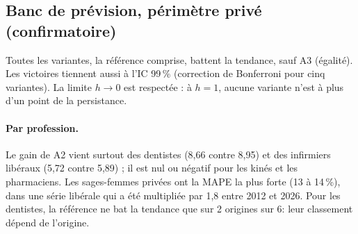 \documentclass[11pt]{article}
\begin{document}
\subsection{Banc de prévision, périmètre privé (confirmatoire)}
\begin{table}[h]
\centering\small
{}
\caption{MAPE par département à cinq ans, départements de 30 professionnels ou plus à l'origine,
moyenne à poids égal sur 22 cellules profession $\times$ origine. Toutes les valeurs sont
mesurées\mesure. IC par bootstrap des départements (2\,000 tirages, graine 20261114).}
\label{tab:prive}
\end{table}

Toutes les variantes, la référence comprise, battent la tendance, sauf A3 (égalité). Les victoires
tiennent aussi à l'IC 99\,\% (correction de Bonferroni pour cinq variantes). La limite $h \to 0$ est
respectée : à $h = 1$, aucune variante n'est à plus d'un point de la persistance.

\paragraph{Par profession.} Le gain de A2 vient surtout des dentistes (8,66 contre 8,95\mesure) et des
infirmiers libéraux (5,72 contre 5,89\mesure) ; il est nul ou négatif pour les kinés et les pharmaciens.
Les sages-femmes privées ont la MAPE la plus forte (13 à 14\,\%\mesure), dans une série libérale qui a
été multipliée par 1,8\mesure{} entre 2012 et 2026. Pour les dentistes, la référence ne bat la tendance
que sur 2 origines sur 6\mesure : leur classement dépend de l'origine.
\end{document}

